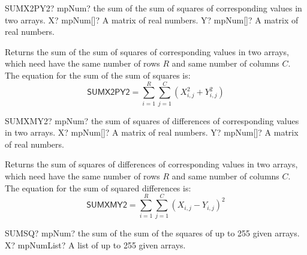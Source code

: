 \begin{mpFunctionsExtract}
	\mpWorksheetFunctionTwoNotImplemented
	{SUMX2PY2? mpNum? the sum of the sum of squares of corresponding values in two arrays.}
	{X? mpNum[]? A matrix of real numbers.}
	{Y? mpNum[]? A matrix of real numbers.}
\end{mpFunctionsExtract}

\vspace{0.3cm}
Returns the sum of the sum of squares of corresponding values in two arrays, which need have the same number of rows $R$ and same number of columns $C$.
The equation for the sum of the sum of squares is: 
\begin{equation}
	\textsf{SUMX2PY2} = \sum_{i=1}^R \sum_{j=1}^C  \left(X_{i,j}^2 + Y_{i,j}^2\right)
\end{equation}




\begin{mpFunctionsExtract}
	\mpWorksheetFunctionTwoNotImplemented
	{SUMXMY2? mpNum? the sum of squares of differences of corresponding values in two arrays.}
	{X? mpNum[]? A matrix of real numbers.}
	{Y? mpNum[]? A matrix of real numbers.}
\end{mpFunctionsExtract}

\vspace{0.3cm}
Returns  the sum of squares of differences of corresponding values in two arrays, which need have the same number of rows $R$ and same number of columns $C$.
The equation for the sum of squared differences is: 
\begin{equation}
	\textsf{SUMXMY2} =  \sum_{i=1}^R \sum_{j=1}^C  \left(X_{i,j} - Y_{i,j}\right)^2
\end{equation}









\begin{mpFunctionsExtract}
	\mpWorksheetFunctionOneNotImplemented
	{SUMSQ? mpNum? the sum of the sum of the squares of up to 255 given arrays.}
	{X? mpNumList? A list of up to 255 given arrays.}
\end{mpFunctionsExtract}

